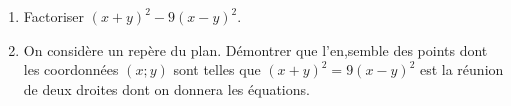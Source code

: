 
\begin{enumerate}
\item Factoriser $(x+y)^2-9(x-y)^2$.
\item On considère \Oij un repère du plan.
Démontrer que l'en,semble des points dont les coordonnées $(x;y)$ sont telles que $(x+y)^2=9(x-y)^2$ est la réunion de deux droites dont on donnera les équations.

\end{enumerate}